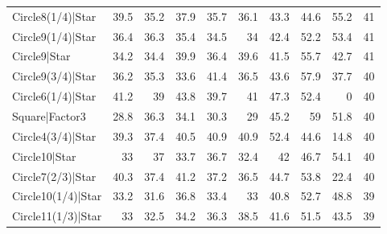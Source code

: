 \begin{tabular}{lrrrrrrrrr}
 Circle8(1/4)|Star                                        &           39.5 &           35.2 &            37.9 &           35.7 &           36.1 &            43.3 &            44.6 &            55.2 &           41 \\
 Circle9(1/4)|Star                                        &           36.4 &           36.3 &            35.4 &           34.5 &           34   &            42.4 &            52.2 &            53.4 &           41 \\
 Circle9|Star                                             &           34.2 &           34.4 &            39.9 &           36.4 &           39.6 &            41.5 &            55.7 &            42.7 &           41 \\
 Circle9(3/4)|Star                                        &           36.2 &           35.3 &            33.6 &           41.4 &           36.5 &            43.6 &            57.9 &            37.7 &           40 \\
 Circle6(1/4)|Star                                        &           41.2 &           39   &            43.8 &           39.7 &           41   &            47.3 &            52.4 &             0   &           40 \\
 Square|Factor3                                           &           28.8 &           36.3 &            34.1 &           30.3 &           29   &            45.2 &            59   &            51.8 &           40 \\
 Circle4(3/4)|Star                                        &           39.3 &           37.4 &            40.5 &           40.9 &           40.9 &            52.4 &            44.6 &            14.8 &           40 \\
 Circle10|Star                                            &           33   &           37   &            33.7 &           36.7 &           32.4 &            42   &            46.7 &            54.1 &           40 \\
 Circle7(2/3)|Star                                        &           40.3 &           37.4 &            41.2 &           37.2 &           36.5 &            44.7 &            53.8 &            22.4 &           40 \\
 Circle10(1/4)|Star                                       &           33.2 &           31.6 &            36.8 &           33.4 &           33   &            40.8 &            52.7 &            48.8 &           39 \\
 Circle11(1/3)|Star                                       &           33   &           32.5 &            34.2 &           36.3 &           38.5 &            41.6 &            51.5 &            43.5 &           39 \\

\end{tabular}
